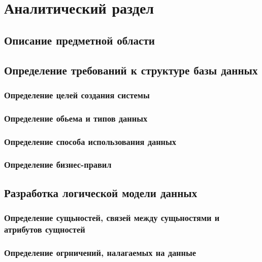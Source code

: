 \chapter{Аналитический раздел}
\label{cha:analysis}
%
%

\section{Описание предметной области}

\section{Определение требований к структуре базы данных}

\subsection{Определение целей создания системы}

\subsection{Определение обьема и типов данных}

\subsection{Определение способа использования данных}

\subsection{Определение бизнес-правил}

\section{Разработка логической модели данных}

\subsection{Определение сущьностей, связей между сущьностями и атрибутов сущностей}

\subsection{Определение огрничений, налагаемых на данные}


